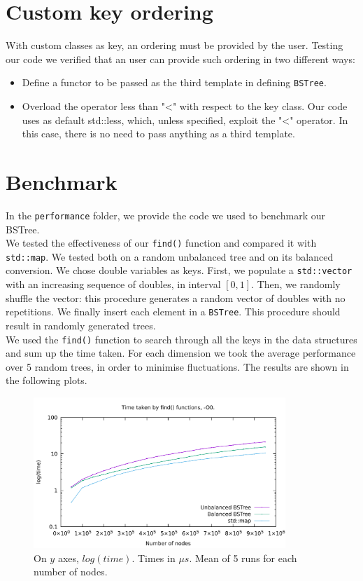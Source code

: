 \documentclass[12pt,a4paper,openany]{scrartcl}
\begin{document}
	\section{Custom key ordering}
	With custom classes as key, an ordering must be provided by the user. Testing our code we verified that an user can provide such ordering in two different ways:
	
	\begin{itemize}
		\item Define a functor to be passed as the third template in defining \texttt{BSTree}.
		\item Overload the operator less than "<" with respect to the key class. Our code uses as default std::less, which, unless specified, exploit the "<" operator. In this case, there is no need to pass anything as a third template.
	\end{itemize}
	
	
	\section{Benchmark}
	In the \texttt{performance} folder, we provide the code we used to benchmark our BSTree.\\
	We tested the effectiveness of our \texttt{find()} function and compared it with \texttt{std::map}. We tested both on a random unbalanced tree and on its balanced conversion. We chose double variables as keys. First, we populate a \texttt{std::vector} with an increasing sequence of doubles, in interval $[0,1]$. Then, we randomly shuffle the vector: this procedure generates a random vector of doubles with no repetitions. We finally insert each element in a \texttt{BSTree}. This procedure should result in randomly generated trees.\\
	
	\noindent We used the \texttt{find()} function to search through all the keys in the data structures and sum up the time taken. For each dimension we took the average performance over 5 random trees, in order to minimise fluctuations. The results are shown in the following plots.
	
	\begin{figure}[H]
		\centering
		\captionsetup{format=plain}
		\caption{On $y$ axes, $log(time)$. Times in $\mu s$. Mean of 5 runs for each number of nodes.}
		\label{fig:O0}
		\includegraphics[width=0.85\textwidth]{img/plotO0.pdf}
	\end{figure}
	
\end{document}

